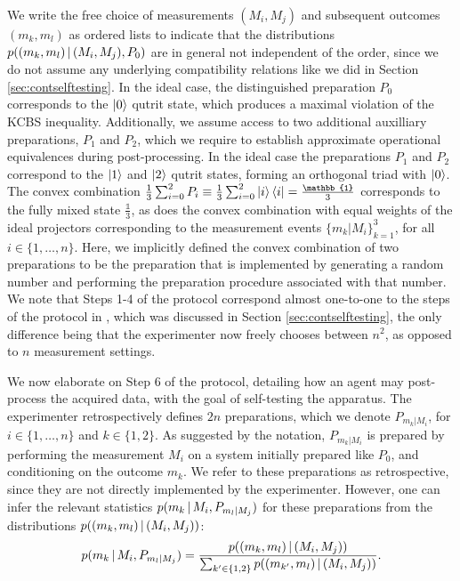 We write the free choice of measurements $(M_i,M_j)$ and subsequent outcomes $(m_k,m_l)$ as ordered lists to indicate that the distributions $p((m_k,m_l)\thinspace\vert\thinspace (M_i,M_j),P_0)$ are in general not independent of the order, since we do not assume any underlying compatibility relations like we did in Section \ref{sec:contselftesting}. In the ideal case, the distinguished preparation $P_0$ corresponds to the $\ket{0}$ qutrit state, which produces a maximal violation of the KCBS inequality. Additionally, we assume access to two additional auxilliary preparations, $P_1$ and $P_2$, which we require to establish approximate operational equivalences during post-processing. In the ideal case the preparations $P_1$ and $P_2$ correspond to the $\ket{1}$ and $\ket{2}$ qutrit states, forming an orthogonal triad with $\ket{0}$. The convex combination $\frac{1}{3}\sum_{i=0}^2 P_i\equiv\frac{1}{3}\sum_{i=0}^2\ket{i}\bra{i}=\frac{\mathbb{1}}{3}$ corresponds to the fully mixed state $\frac{\mathbb{1}}{3}$, as does the convex combination with equal weights of the ideal projectors corresponding to the measurement events $\{m_k\vert M_i\}_{k=1}^3$, for all $i\in\{1,\dots,n\}$. Here, we implicitly defined the convex combination of two preparations to be the preparation that is implemented by generating a random number and performing the preparation procedure associated with that number. We note that Steps 1-4 of the protocol correspond almost one-to-one to the steps of the protocol in \cite{Bharti2019}, which was discussed in Section \ref{sec:contselftesting}, the only difference being that the experimenter now freely chooses between $n^2$, as opposed to $n$ measurement settings.

We now elaborate on Step 6 of the protocol, detailing how an agent may post-process the acquired data, with the goal of self-testing the apparatus. The experimenter retrospectively defines $2n$ preparations, which we denote $P_{m_k\vert M_i}$, for $i\in\{1,\dots,n\}$ and $k\in\{1,2\}$. As suggested by the notation, $P_{m_k\vert M_i}$ is prepared by performing the measurement $M_i$ on a system initially prepared like $P_0$, and conditioning on the outcome $m_k$. We refer to these preparations as retrospective, since they are not directly implemented by the experimenter. However, one can infer the relevant statistics $p(m_k\thinspace\vert\thinspace M_i, P_{m_l\vert M_j})$ for these preparations from the distributions $p((m_k,m_l)\thinspace\vert\thinspace (M_i,M_j))$:
\begin{equation*}
p(m_k\thinspace\vert\thinspace M_i, P_{m_l\vert M_j})=\frac{p((m_k,m_l)\thinspace\vert\thinspace (M_i,M_j))}{\sum_{k'\in\{1,2\}} p((m_{k'},m_l)\thinspace\vert\thinspace (M_i,M_j))}.
\end{equation*}

